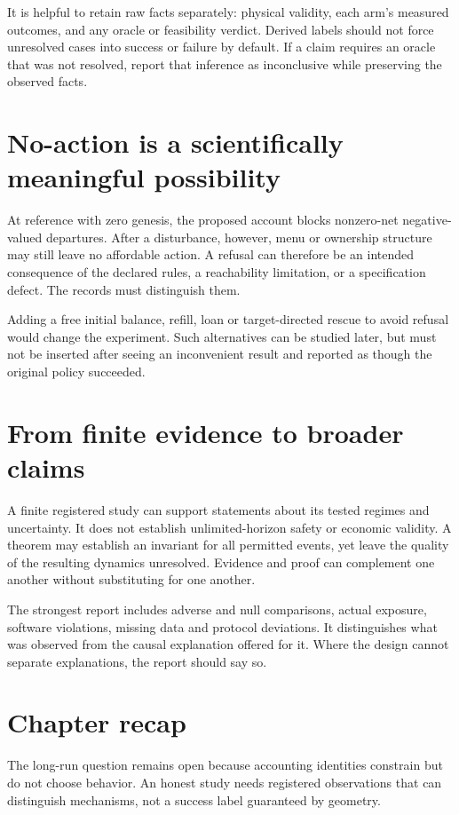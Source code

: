It is helpful to retain raw facts separately: physical validity, each arm's
measured outcomes, and any oracle or feasibility verdict. Derived labels
should not force unresolved cases into success or failure by default.
If a claim requires an oracle that was not resolved, report that inference
as inconclusive while preserving the observed facts.

\section{No-action is a scientifically meaningful possibility}
At reference with zero genesis, the proposed account blocks nonzero-net
negative-valued departures. After a disturbance, however, menu or ownership
structure may still leave no affordable action. A refusal can therefore be
an intended consequence of the declared rules, a reachability limitation,
or a specification defect. The records must distinguish them.

Adding a free initial balance, refill, loan or target-directed rescue to
avoid refusal would change the experiment. Such alternatives can be studied
later, but must not be inserted after seeing an inconvenient result and
reported as though the original policy succeeded.

\section{From finite evidence to broader claims}
A finite registered study can support statements about its tested regimes
and uncertainty. It does not establish unlimited-horizon safety or economic
validity. A theorem may establish an invariant for all permitted events,
yet leave the quality of the resulting dynamics unresolved. Evidence and
proof can complement one another without substituting for one another.

The strongest report includes adverse and null comparisons, actual exposure,
software violations, missing data and protocol deviations. It distinguishes
what was observed from the causal explanation offered for it. Where the
design cannot separate explanations, the report should say so.

\section*{Chapter recap}
The long-run question remains open because accounting identities constrain
but do not choose behavior. An honest study needs registered observations
that can distinguish mechanisms, not a success label guaranteed by geometry.
